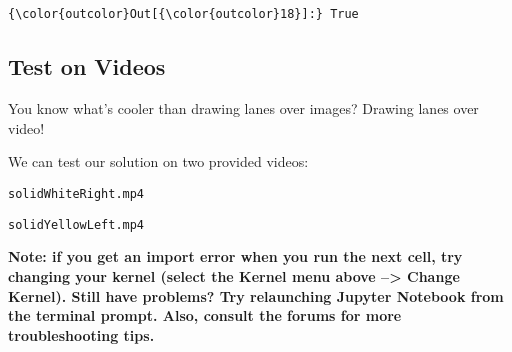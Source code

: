 \documentclass[11pt]{article}
\begin{document}
    \begin{center}
    \end{center}
    { \hspace*{\fill} \\}
    
    \begin{center}
    \end{center}
    { \hspace*{\fill} \\}
    
    \begin{center}
    \end{center}
    { \hspace*{\fill} \\}
    
    \begin{center}
    \end{center}
    { \hspace*{\fill} \\}
    
\begin{Verbatim}[commandchars=\\\{\}]
{\color{outcolor}Out[{\color{outcolor}18}]:} True
\end{Verbatim}
            
    \hypertarget{test-on-videos}{%
\subsection{Test on Videos}\label{test-on-videos}}

You know what's cooler than drawing lanes over images? Drawing lanes
over video!

We can test our solution on two provided videos:

\texttt{solidWhiteRight.mp4}

\texttt{solidYellowLeft.mp4}

\textbf{Note: if you get an import error when you run the next cell, try
changing your kernel (select the Kernel menu above --\textgreater{}
Change Kernel). Still have problems? Try relaunching Jupyter Notebook
from the terminal prompt. Also, consult the forums for more
troubleshooting tips.}
\end{document}

